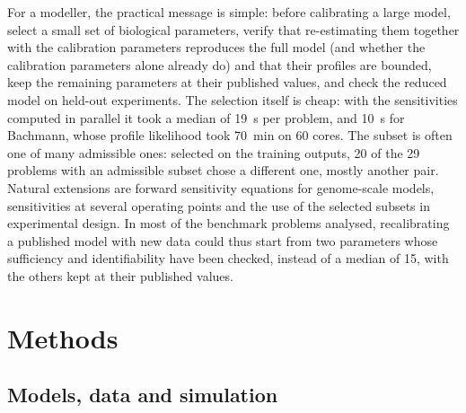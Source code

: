 \documentclass[pdflatex,sn-nature]{sn-jnl}
\theoremstyle{plain}
\begin{document}
For a modeller, the practical message is simple: before calibrating a large model, select a small set of biological parameters, verify that re-estimating them together with the calibration parameters reproduces the full model (and whether the calibration parameters alone already do) and that their profiles are bounded, keep the remaining parameters at their published values, and check the reduced model on held-out experiments. The selection itself is cheap: with the sensitivities computed in parallel it took a median of 19~s per problem, and 10~s for Bachmann, whose profile likelihood took 70~min on 60 cores. The subset is often one of many admissible ones: selected on the training outputs, 20 of the 29 problems with an admissible subset chose a different one, mostly another pair. Natural extensions are forward sensitivity equations for genome-scale models\cite{bib12}, sensitivities at several operating points and the use of the selected subsets in experimental design\cite{bib28}. In most of the benchmark problems analysed, recalibrating a published model with new data could thus start from two parameters whose sufficiency and identifiability have been checked, instead of a median of 15, with the others kept at their published values.

\section*{Methods}\label{sec:methods}

\subsection*{Models, data and simulation}\label{met:models}
\end{document}
